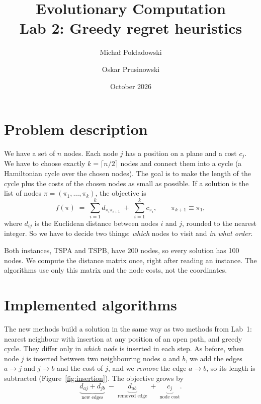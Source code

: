 \documentclass[11pt,a4paper]{article}
\title{Evolutionary Computation\\[0.3em]\large Lab 2: Greedy regret heuristics}
\author{Michał Pokładowski \and Oskar Prusinowski}
\date{October 2026}
\begin{document}
\maketitle

\section{Problem description}

We have a set of $n$ nodes. Each node $j$ has a position on a plane and a cost
$c_j$. We have to choose exactly $k = \lceil n/2 \rceil$ nodes and connect them
into a cycle (a Hamiltonian cycle over the chosen nodes). The goal is to make
the length of the cycle plus the costs of the chosen nodes as small as
possible. If a solution is the list of nodes $\pi = (\pi_1, \dots, \pi_k)$, the
objective is
\[
  f(\pi) \;=\; \sum_{i=1}^{k} d_{\pi_i \pi_{i+1}} \;+\; \sum_{i=1}^{k} c_{\pi_i},
  \qquad \pi_{k+1} \equiv \pi_1 ,
\]
where $d_{ij}$ is the Euclidean distance between nodes $i$ and $j$, rounded to
the nearest integer. So we have to decide two things: \emph{which} nodes to
visit and \emph{in what order}.

Both instances, TSPA and TSPB, have 200 nodes, so every solution has 100 nodes.
We compute the distance matrix once, right after reading an instance. The
algorithms use only this matrix and the node costs, not the coordinates.

\section{Implemented algorithms}

The new methods build a solution in the same way as two methods from Lab~1:
nearest neighbour with insertion at any position of an open path, and greedy
cycle. They differ only in \emph{which node} is inserted in each step. As
before, when node $j$ is inserted between two neighbouring nodes $a$ and $b$,
we add the edges $a \to j$ and $j \to b$ and the cost of $j$, and we
\emph{remove} the edge $a \to b$, so its length is subtracted
(Figure~\ref{fig:insertion}). The objective grows by
\[
  \underbrace{d_{aj} + d_{jb}}_{\text{new edges}}
  \;-\; \underbrace{d_{ab}}_{\text{removed edge}}
  \;+\; \underbrace{c_j}_{\text{node cost}} .
\]
\end{document}
